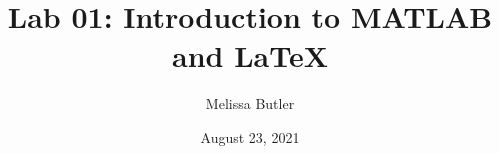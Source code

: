 \newcommand{\course}{MATH 3341}
\title{Lab 01: Introduction to MATLAB and \LaTeX{}}
\author{Melissa Butler}
\date{August 23, 2021}
